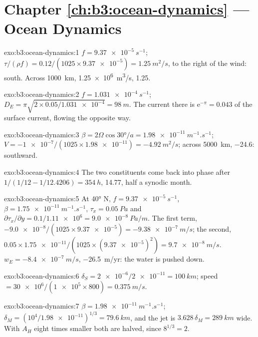 \section*{Chapter \ref{ch:b3:ocean-dynamics} --- Ocean Dynamics}

\begin{solution}{exo:b3:ocean-dynamics:1}
$f = \qty{9.37e-5}{s^{-1}}$; $\tau/(\rho f) = 0.12/(1025\times\num{9.37e-5})
= \qty{1.25}{m^2/s}$, to the right of the wind: south. Across
\qty{1000}{km}, \qty{1.25e6}{m^3/s}, \qty{1.25}{\sverdrup}.
\end{solution}

\begin{solution}{exo:b3:ocean-dynamics:2}
$f = \qty{1.031e-4}{s^{-1}}$; $D_E = \pi\sqrt{2\times0.05/\num{1.031e-4}}
= \qty{98}{m}$. The current there is $\mathrm e^{-\pi} = \num{0.043}$ of the
surface current, flowing the opposite way.
\end{solution}

\begin{solution}{exo:b3:ocean-dynamics:3}
$\beta = 2\Omega\cos\ang{30}/a = \qty{1.98e-11}{m^{-1}.s^{-1}}$; $V =
\num{-1e-7}/(1025\times\num{1.98e-11}) = \qty{-4.92}{m^2/s}$; across
\qty{5000}{km}, \qty{-24.6}{\sverdrup}: southward.
\end{solution}

\begin{solution}{exo:b3:ocean-dynamics:4}
The two constituents come back into phase after $1/(1/12 - 1/12.4206) =
\qty{354}{h}$, \num{14.77}, half a synodic month.
\end{solution}

\begin{solution}{exo:b3:ocean-dynamics:5}
At \ang{40} N, $f = \qty{9.37e-5}{s^{-1}}$, $\beta =
\qty{1.75e-11}{m^{-1}.s^{-1}}$, $\tau_x = \qty{0.05}{Pa}$ and
$\partial\tau_x/\partial y = 0.1/\num{1.11e6} = \qty{9.0e-8}{Pa/m}$. The
first term, $-\num{9.0e-8}/(1025\times\num{9.37e-5}) =
\qty{-9.38e-7}{m/s}$; the second, $0.05\times\num{1.75e-11}/(1025\times
(\num{9.37e-5})^2) = \qty{+9.7e-8}{m/s}$. $w_E = \qty{-8.4e-7}{m/s}$,
\qty{-26.5}{m/yr}: the water is pushed down.
\end{solution}

\begin{solution}{exo:b3:ocean-dynamics:6}
$\delta_S = \num{2e-6}/\num{2e-11} = \qty{100}{km}$; speed $=
\num{30e6}/(\num{1e5}\times800) = \qty{0.375}{m/s}$.
\end{solution}

\begin{solution}{exo:b3:ocean-dynamics:7}
$\beta = \qty{1.98e-11}{m^{-1}.s^{-1}}$; $\delta_M = (10^4/\num{1.98e-11})^{1/3}
= \qty{79.6}{km}$, and the jet is $3.628\,\delta_M = \qty{289}{km}$ wide.
With $A_H$ eight times smaller both are halved, since $8^{1/3} = 2$.
\end{solution}

